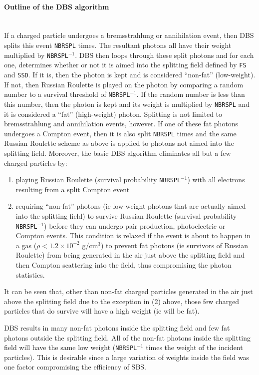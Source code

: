 \documentclass[12pt,twoside]{article}
\begin{document}
\paragraph{Outline of the DBS algorithm}\mbox{}\\
If a charged particle undergoes a bremsstrahlung or
annihilation event, then
DBS splits this event {\tt NBRSPL} times.  The resultant photons
all have their weight multiplied by {\tt NBRSPL}$^{-1}$.  DBS
then loops through these split photons and for each one,
determines whether or not it is aimed into the splitting field
defined by {\tt FS} and {\tt SSD}.  If it
 
is, then the photon is kept and is considered ``non-fat'' (low-weight).
If not, then Russian Roulette is played
on the photon by comparing a random number to a survival threshold of
{\tt NBRSPL}$^{-1}$.  If the random number is less than this number,
then the photon is kept and its weight is multiplied by
{\tt NBRSPL} and it is considered a ``fat'' (high-weight) photon.  Splitting
is not limited to bremsstrahlung and annihilation events, however.
If one of these
fat photons undergoes a Compton event, then it is also split {\tt NBRSPL}
times and the same Russian Roulette scheme as above is applied to
photons not aimed into the splitting field.  Moreover, the basic DBS
algorithm eliminates all but a few charged particles by:
\begin{enumerate}
\item playing Russian Roulette (survival probability {\tt NBRSPL}$^{-1}$)
with all electrons resulting from a split Compton event
\item requiring ``non-fat'' photons (ie low-weight photons that are
actually aimed
into the splitting field) to survive Russian Roulette
(survival probability {\tt NBRSPL}$^{-1}$) before they can undergo
pair production, photoelectric or Compton events.  This condition
is relaxed if the event is about to happen in a gas ($\rho<1.2\times10^{-2}$
g/cm$^3$) to prevent fat photons (ie survivors of Russian Roulette)
from being generated in the air just above the splitting field and then
Compton scattering into the field, thus compromising the photon statistics.

\end{enumerate}
It can be seen that, other than non-fat charged particles generated in the air
just above the splitting field due to the exception in (2) above,
those few charged particles that do survive will have a high weight
(ie will be fat).

DBS results in many non-fat photons inside the
splitting field and few fat photons outside the splitting field.  All of the
non-fat photons inside the splitting field will have the same low weight
({\tt NBRSPL}$^{-1}$ times the weight of the incident particles).  This
is desirable since a large
variation of weights inside the field was one factor compromising
the efficiency of SBS.
\end{document}
